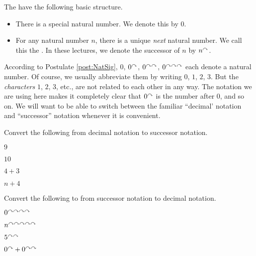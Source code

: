 \begin{postulate}\label{post:NatSig}
The  have the following basic structure.
  \begin{itemize}
  \item There is a special natural number. We denote this by $0$.
  \item For any natural number $n$, there is
    a unique \emph{next} natural number. We call this the . 
    In these lectures, we denote the successor of $n$ by $n^\curvearrowright$.
  \end{itemize}
\end{postulate}

According to Postulate \ref{post:NatSig}, $0$, $0^\curvearrowright$, $0^{\curvearrowright\curvearrowright}$, $0^{\curvearrowright\curvearrowright\curvearrowright}$ each denote a natural number. 
Of course, we usually abbreviate them by writing $0$, $1$, $2$, $3$.
But the \emph{characters} $1$, $2$, $3$, etc., are not related to each other in any way.
The notation we are using here makes it completely clear that $0^\curvearrowright$ is the number after $0$, and so on. 
We will want to be able to switch between the familiar ``decimal' notation and ``successor'' notation whenever it is convenient.

\begin{exer}
\begin{multicols}{2}
\item Convert the following from decimal notation to successor notation.
  \begin{exercise}
  \item $9$
  \item $10$
  \item $4 + 3$
  \item $n + 4$
  \end{exercise}
\item Convert the following to from successor notation to decimal notation.
\begin{exercise}
\item $0^{\curvearrowright\curvearrowright\curvearrowright\curvearrowright}$
\item $n^{\curvearrowright\curvearrowright\curvearrowright\curvearrowright\curvearrowright}$
\item $5^{\curvearrowright\curvearrowright}$
\item $0^\curvearrowright + 0^{\curvearrowright\curvearrowright}$
\end{exercise}
\end{multicols}
\end{exer}

